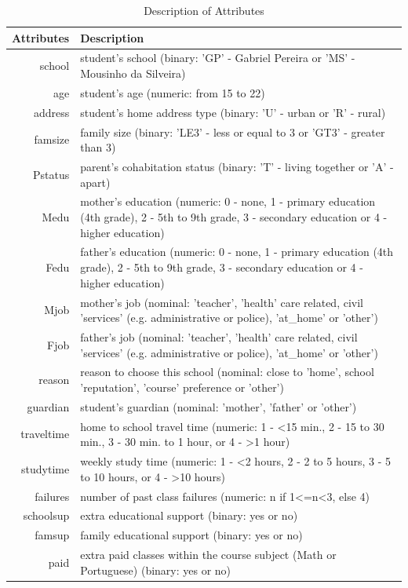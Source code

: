 \documentclass[conference]{IEEEtran}
\begin{document}
\begin{table}[!t]
\renewcommand{\arraystretch}{1.3}
\caption{Description of Attributes}
\label{table:attr-descr}
\centering
\begin{tabular}{|r || l|}
\hline
\bfseries Attributes & \bfseries Description \\
\hline\hline
school & student's school (binary: 'GP' - Gabriel Pereira or 'MS' - Mousinho da Silveira)\\
age & student's age (numeric: from 15 to 22)\\
address & student's home address type (binary: 'U' - urban or 'R' - rural)\\
famsize & family size (binary: 'LE3' - less or equal to 3 or 'GT3' - greater than 3)\\
Pstatus & parent's cohabitation status (binary: 'T' - living together or 'A' - apart)\\
Medu & mother's education (numeric: 0 - none, 1 - primary education (4th grade), 2 - 5th to 9th grade, 3 - secondary education or 4 - higher education)\\
Fedu & father's education (numeric: 0 - none, 1 - primary education (4th grade), 2 - 5th to 9th grade, 3 - secondary education or 4 - higher education)\\
Mjob & mother's job (nominal: 'teacher', 'health' care related, civil 'services' (e.g. administrative or police), 'at\_home' or 'other')\\
Fjob & father's job (nominal: 'teacher', 'health' care related, civil 'services' (e.g. administrative or police), 'at\_home' or 'other')\\
reason & reason to choose this school (nominal: close to 'home', school 'reputation', 'course' preference or 'other')\\
guardian & student's guardian (nominal: 'mother', 'father' or 'other')\\
traveltime & home to school travel time (numeric: 1 - <15 min., 2 - 15 to 30 min., 3 - 30 min. to 1 hour, or 4 - >1 hour)\\
studytime & weekly study time (numeric: 1 - <2 hours, 2 - 2 to 5 hours, 3 - 5 to 10 hours, or 4 - >10 hours)\\
failures & number of past class failures (numeric: n if 1<=n<3, else 4)\\
schoolsup & extra educational support (binary: yes or no)\\
famsup & family educational support (binary: yes or no)\\
paid & extra paid classes within the course subject (Math or Portuguese) (binary: yes or no)\\

\end{tabular}
\end{table}
\end{document}
